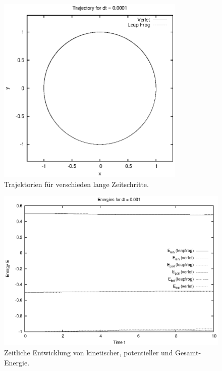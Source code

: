 \documentclass[a4paper,11pt]{scrartcl}
\begin{document}
\begin{figure}[tbp]
\includegraphics[width=0.8\textwidth]{../trajectories_0_0001}
\caption{Trajektorien für verschieden lange Zeitschritte.}\label{fig:traj}
\end{figure}


\begin{figure}[tbp]
\centering
\includegraphics[width=1.0\textwidth]{../energies_0_001}
\caption{Zeitliche Entwicklung von kinetischer, potentieller und Gesamt-Energie.}\label{fig:en}
\end{figure}

\end{document}
